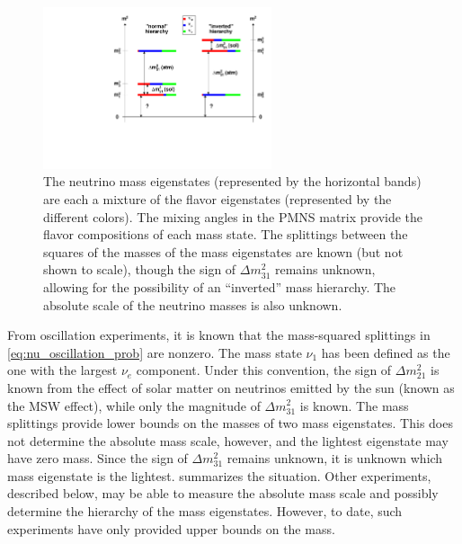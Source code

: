 \documentclass[herrin-thesis.tex]{subfiles}
\begin{document}
\begin{figure}[htp]
	\centering
	\includegraphics[width=0.6\textwidth]{./plots/nu_mixing.pdf}
	\caption[Neutrino mixing and mass hierarchy]{The neutrino mass eigenstates (represented by the horizontal bands) are each a mixture of the flavor eigenstates (represented by the different colors). The mixing angles in the PMNS matrix provide the flavor compositions of each mass state. The splittings between the squares of the masses of the mass eigenstates are known (but not shown to scale), though the sign of \(\Delta m_{31}^2\) remains unknown, allowing for the possibility of an ``inverted'' mass hierarchy. The absolute scale of the neutrino masses is also unknown.}
	\label{fig:nu_mixing}
\end{figure}

From oscillation experiments, it is known that the mass-squared splittings in \cref{eq:nu_oscillation_prob} are nonzero. The mass state \(\nu_1\) has been defined as the one with the largest \(\nu_e\) component. Under this convention, the sign of \(\Delta m_{21}^2\) is known from the effect of solar matter on neutrinos emitted by the sun (known as the MSW effect), while only the magnitude of \(\Delta m_{31}^2\) is known. The mass splittings provide lower bounds on the masses of two mass eigenstates. This does not determine the absolute mass scale, however, and the lightest eigenstate may have zero mass. Since the sign of \(\Delta m_{31}^2\) remains unknown, it is unknown which mass eigenstate is the lightest.  summarizes the situation. Other experiments, described below, may be able to measure the absolute mass scale and possibly determine the hierarchy of the mass eigenstates. However, to date, such experiments have only provided upper bounds on the mass.
\end{document}
